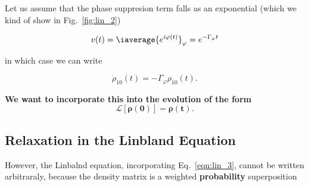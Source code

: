  
\noindent Let us assume that the phase suppresion  term falls as an exponential (which we kind
of show in Fig.~\ref{fig:lin_2})
  
  \begin{equation}\label{key}
    v(t) = \iaverage{e^{i\varphi(t)}}_\varphi = e^{-\Gamma_{\varphi}t}
  \end{equation}
  
  \noindent in which case we can write
  
  \begin{equation}\label{eqn:lin_3}
    \dot{\rho}_{10}(t) = -\Gamma_{\varphi}\rho_{10}(t).
  \end{equation}
  
  \noindent \textbf{We want to incorporate this into the evolution of the form}
  \begin{equation}\label{eq:linrelax_5}
    \mathbf{\mathcal{L}[\rho(0)] = \rho(t)}.
  \end{equation}
  \subsection{Relaxation in the Linbland Equation}
  However,  the  Linbalnd equation,  incorporating  Eq.~\eqref{eqn:lin_3},  cannot be  written
  arbitraraly, because the density matrix is a weighted \textbf{probability} superposition
  
